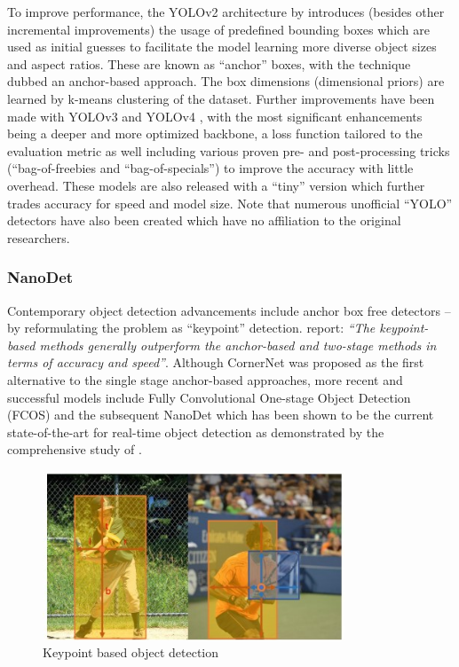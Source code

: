 \documentclass[a4paper,twoside,12pt]{report}
\begin{document}
To improve performance, the YOLOv2 architecture by \cite{yolov2} introduces (besides other incremental improvements) the usage of predefined bounding boxes which are used as initial guesses to facilitate the model learning more diverse object sizes and aspect ratios. These are known as ``anchor'' boxes, with the technique dubbed an anchor-based approach. The box dimensions (dimensional priors) are learned by k-means clustering of the dataset. Further improvements have been made with YOLOv3 \citep{yolov3} and YOLOv4 \citep{yolov4}, with the most significant enhancements being a deeper and more optimized backbone, a loss function tailored to the evaluation metric as well including various proven pre- and post-processing tricks (``bag-of-freebies and ``bag-of-specials'') to improve the accuracy with little overhead. These models are also released with a ``tiny'' version which further trades accuracy for speed and model size. Note that numerous unofficial ``YOLO'' detectors have also been created which have no affiliation to the original researchers.

\subsubsection{NanoDet}

Contemporary object detection advancements include anchor box free detectors -- by reformulating the problem as ``keypoint'' detection. \cite{comprehensive} report: \textit{``The keypoint-based methods generally outperform the anchor-based and two-stage methods in terms of accuracy and speed''}. Although CornerNet \citep{cornernet} was proposed as the first alternative to the single stage anchor-based approaches, more recent and successful models include Fully Convolutional One-stage Object Detection (FCOS) \citep{fcos} and the subsequent NanoDet \citep{nanodet} which has been shown to be the current state-of-the-art for real-time object detection as demonstrated by the comprehensive study of \cite{comprehensive}.

\begin{figure}[h!]
\begin{center}
\includegraphics[width=9cm]{images/keypointdetect.jpg}
\caption{Keypoint based object detection \citep{fcos}}
\label{fig:keypointdetect}
\end{center}
\end{figure}
\end{document}
